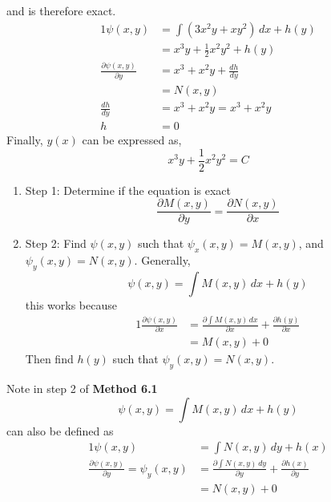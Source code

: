 \documentclass[twoside]{report}
\begin{document}
\begin{example}
        and is therefore exact.
        \begin{alignat}{1}
            \psi(x, y) &= \int(3x^{2}y + xy^{2})\,dx + h(y)\\
            &= x^{3}y + \frac{1}{2}x^{2}y^{2}+h(y)\\
            \frac{\partial\psi(x, y)}{\partial y} &= x^{3} + x^{2}y + \frac{dh}{dy}\\
            &= N(x, y)\\
            \frac{dh}{dy} &= x^{3} + x^{2}y = x^{3} + x^{2}y\label{6232}\\
            h &= 0
        \end{alignat}
        Finally, $y(x)$ can be expressed as,
        \begin{equation}
            x^{3}y + \frac{1}{2}x^{2}y^{2} = C
        \end{equation}
    \end{example}
    \begin{method}
        \begin{enumerate}
            \item Step 1: Determine if the equation is exact
            \begin{equation}
                \frac{\partial M(x, y)}{\partial y} = \frac{\partial N(x, y)}{\partial x}
            \end{equation}
            \item Step 2: Find $\psi(x, y)$ such that $\psi_{x}(x, y) = M(x, y)$, and $\psi_{y}(x, y) = N(x, y)$. Generally,
            \begin{equation}
                    \psi(x, y) = \int M(x, y)\,dx + h(y)
            \end{equation}
            this works because
            \begin{alignat}{1}
                \frac{\partial \psi(x, y)}{\partial x} &= \frac{\partial \int M(x, y)\,dx}{\partial x} + \frac{\partial h(y)}{\partial x}\\
                &= M(x, y) + 0 
            \end{alignat}
            Then find $h(y)$ such that $\psi_{y}(x, y) = N(x, y)$.
        \end{enumerate}
    \end{method}
    \begin{remark}
        Note in step 2 of \textbf{Method 6.1}
        \begin{equation}
            \psi(x, y) = \int M(x, y)\,dx + h(y)
        \end{equation}
        can also be defined as
        \begin{alignat}{1}
            \psi(x, y) &= \int N(x, y)\,dy + h(x)\\
            \frac{\partial \psi(x, y)}{\partial y} = \psi_{y}(x, y) &= \frac{\partial \int N(x, y)\,dy}{\partial y} + \frac{\partial h(x)}{\partial y}\\
            &= N(x, y) + 0
        \end{alignat}
    \end{remark}
\end{document}
